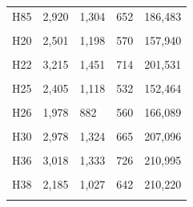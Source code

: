 \documentclass[
  a4paper,
  titlepage]{article}
\begin{document}
\begin{longtable}[t]{lllll}
H85 & 2,920 & 1,304 & 652 & 186,483\\
 
\cellcolor{gray!6}{H3J23} & \cellcolor{gray!6}{2,270} & \cellcolor{gray!6}{998} & \cellcolor{gray!6}{547} & \cellcolor{gray!6}{133,330}\\
 
H20 & 2,501 & 1,198 & 570 & 157,940\\
 
\cellcolor{gray!6}{H21} & \cellcolor{gray!6}{2,763} & \cellcolor{gray!6}{1,289} & \cellcolor{gray!6}{637} & \cellcolor{gray!6}{175,546}\\
 
H22 & 3,215 & 1,451 & 714 & 201,531\\
 
\cellcolor{gray!6}{H23} & \cellcolor{gray!6}{2,460} & \cellcolor{gray!6}{1,159} & \cellcolor{gray!6}{578} & \cellcolor{gray!6}{152,989}\\
 
H25 & 2,405 & 1,118 & 532 & 152,464\\
 
\cellcolor{gray!6}{H1} & \cellcolor{gray!6}{2,167} & \cellcolor{gray!6}{1,060} & \cellcolor{gray!6}{584} & \cellcolor{gray!6}{155,623}\\
 
H26 & 1,978 & 882 & 560 & 166,089\\
 
\cellcolor{gray!6}{H28} & \cellcolor{gray!6}{1,980} & \cellcolor{gray!6}{946} & \cellcolor{gray!6}{589} & \cellcolor{gray!6}{187,174}\\
 
H30 & 2,978 & 1,324 & 665 & 207,096\\
 
\cellcolor{gray!6}{H31} & \cellcolor{gray!6}{2,078} & \cellcolor{gray!6}{948} & \cellcolor{gray!6}{638} & \cellcolor{gray!6}{193,737}\\
 
H36 & 3,018 & 1,333 & 726 & 210,995\\
 
\cellcolor{gray!6}{H37} & \cellcolor{gray!6}{1,506} & \cellcolor{gray!6}{736} & \cellcolor{gray!6}{456} & \cellcolor{gray!6}{134,619}\\
 
H38 & 2,185 & 1,027 & 642 & 210,220\\
 
\cellcolor{gray!6}{H39} & \cellcolor{gray!6}{2,580} & \cellcolor{gray!6}{1,148} & \cellcolor{gray!6}{599} & \cellcolor{gray!6}{158,253}\\
 

\end{longtable}
\end{document}

